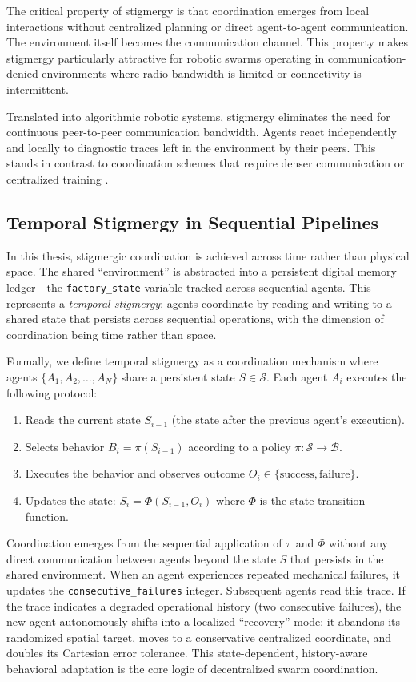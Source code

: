 \documentclass[12pt,a4paper,oneside]{report}
\begin{document}
The critical property of stigmergy is that coordination emerges from local interactions without centralized planning or direct agent-to-agent communication. The environment itself becomes the communication channel. This property makes stigmergy particularly attractive for robotic swarms operating in communication-denied environments where radio bandwidth is limited or connectivity is intermittent.

Translated into algorithmic robotic systems, stigmergy eliminates the need for continuous peer-to-peer communication bandwidth. Agents react independently and locally to diagnostic traces left in the environment by their peers. This stands in contrast to coordination schemes that require denser communication or centralized training \cite{domberg2026selfadapting, daneshmand2026slowrl}.

\subsection{Temporal Stigmergy in Sequential Pipelines}

In this thesis, stigmergic coordination is achieved across time rather than physical space. The shared ``environment'' is abstracted into a persistent digital memory ledger---the \texttt{factory\_state} variable tracked across sequential agents. This represents a \textit{temporal stigmergy}: agents coordinate by reading and writing to a shared state that persists across sequential operations, with the dimension of coordination being time rather than space.

Formally, we define temporal stigmergy as a coordination mechanism where agents $\{A_1, A_2, \ldots, A_N\}$ share a persistent state $S \in \mathcal{S}$. Each agent $A_i$ executes the following protocol:
\begin{enumerate}
    \item Reads the current state $S_{i-1}$ (the state after the previous agent's execution).
    \item Selects behavior $B_i = \pi(S_{i-1})$ according to a policy $\pi: \mathcal{S} \rightarrow \mathcal{B}$.
    \item Executes the behavior and observes outcome $O_i \in \{\text{success}, \text{failure}\}$.
    \item Updates the state: $S_i = \Phi(S_{i-1}, O_i)$ where $\Phi$ is the state transition function.
\end{enumerate}
Coordination emerges from the sequential application of $\pi$ and $\Phi$ without any direct communication between agents beyond the state $S$ that persists in the shared environment. When an agent experiences repeated mechanical failures, it updates the \texttt{consecutive\_failures} integer. Subsequent agents read this trace. If the trace indicates a degraded operational history (two consecutive failures), the new agent autonomously shifts into a localized ``recovery'' mode: it abandons its randomized spatial target, moves to a conservative centralized coordinate, and doubles its Cartesian error tolerance. This state-dependent, history-aware behavioral adaptation is the core logic of decentralized swarm coordination.
\end{document}
